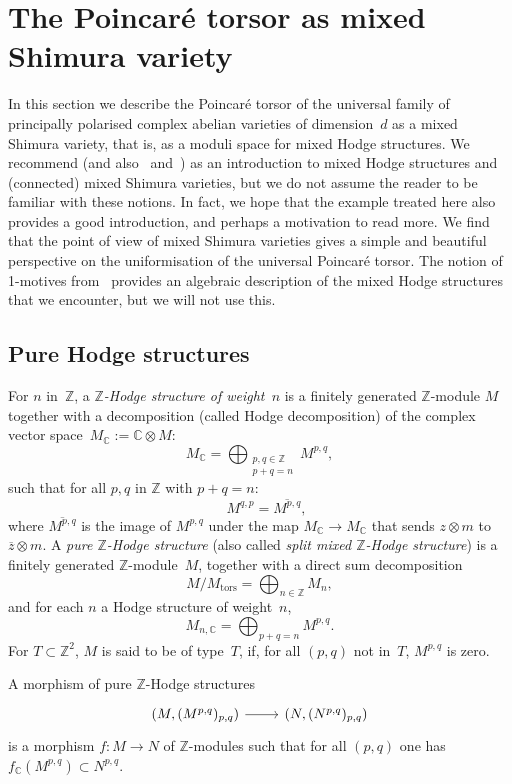 \documentclass[JEP,XML,SOM,Unicode,NoFloatCountersInSection]{cedram}
\theoremstyle{plain}
\theoremstyle{definition}
\numberwithin{equation}{subsection}
\let\ol\overline
\renewcommand{\C}{\mathbb C}
\newcommand{\Z}{\mathbb Z}
\newcommand{\tors}{\mathrm{tors}}
\begin{document}
\section{The Poincaré torsor as mixed Shimura variety}\label{sec4}
In this section we describe the Poincaré torsor of the universal
family of principally polarised complex abelian varieties of
dimension~$d$ as a mixed Shimura variety, that is, as a moduli space
for mixed Hodge structures. We recommend \cite[\S 2]{Pink1} (and
also~\cite{Klingler} and~\cite{HodgeII}) as an introduction to mixed
Hodge structures and (connected) mixed Shimura varieties, but we do
not assume the reader to be familiar with these notions. In fact, we
hope that the example treated here also provides a good introduction,
and perhaps a motivation to read more. We find that the point of view
of mixed Shimura varieties gives a simple and beautiful perspective on
the uniformisation of the universal Poincaré torsor. The notion of
1-motives from~\cite{HodgeIII} provides an algebraic description of
the mixed Hodge structures that we encounter, but we will not use this.

\subsection{Pure Hodge structures}
\label{sec:phs}
For $n$ in~$\Z$, a \emph{$\Z$-Hodge structure of weight~$n$} is a
finitely generated $\Z$-module $M$ together with a decomposition
(called Hodge decomposition) of the complex vector
space~$M_\C:=\C\otimes M$:
\[
M_\C = \bigoplus_{\substack{p,q\in\Z\\p+q=n}} M^{p,q},
\]
such that for all $p,q$ in $\Z$ with $p+q=n$:
\[
\quad M^{q,p}=\ol{M^{p,q}},
\]
where $\ol{M^{p,q}}$ is the image of $M^{p,q}$ under the map
$M_\C\to M_\C$ that sends $z\otimes m$ to $\ol{z}\otimes m$. A
\emph{pure $\Z$-Hodge structure} (also called \emph{split mixed
$\Z$-Hodge structure}) is a finitely generated $\Z$-module~$M$,
together with a direct sum decomposition
\[
M/M_\tors=\bigoplus_{n\in\Z}M_n,
\]
and for each $n$ a Hodge structure of weight~$n$,
\[
M_{n,\C}=\bigoplus_{p+q=n}M^{p,q}.
\]
For $T\subset\Z^2$, $M$ is said to be of type~$T$, if, for all $(p,q)$
not in~$T$, $M^{p,q}$ is zero.

A morphism of pure $\Z$-Hodge structures
\[
\begin{tikzcd}
(M,(M^{p,q})_{p,q}) \ar[r] & (N,(N^{p,q})_{p,q})
\end{tikzcd}
\]
is a morphism $f\colon M\!\to\!N$ of $\Z$-modules
such that for all $(p,q)$ one has $f_\C(M^{p,q})\!\subset\!N^{p,q}$.
\end{document}
